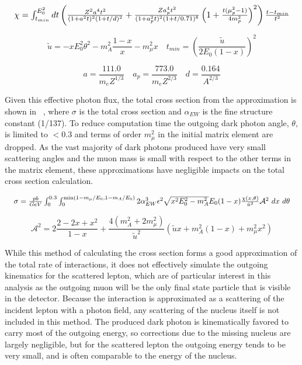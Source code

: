 \begin{equation}
    \label{eq:chi}
    \resizebox{\textwidth}{!}{
    $\chi = \int^{E_0^2}_{t_{min}} dt \left( \frac{Z^2a^4t^2}{(1+a^2t)^2(1+t/d)^2}+\frac{Za_p^4t^2}{(1+a_p^2t)^2(1+t/0.71)^8}\left(1+\frac{t(\mu_p^2-1)}{4m_p^2}\right)^2\right)\frac{t-t_{min}}{t^2}$
    }
\end{equation}	


\begin{equation}
	\label{eq:utilde}
	\tilde{u} = -xE_0^2\theta^2 - m_A^2\frac{1-x}{x} - m_\mu^2x
	\quad
	t_{min} = \left(\frac{\tilde{u}}{2E_0(1-x)}\right)^2
\end{equation}

\begin{equation}
	\label{eq:adefs}
	a = \frac{111.0}{m_e Z^{1/3}}
	\quad
	a_p = \frac{773.0}{m_e Z^{2/3}}
	\quad
	d = \frac{0.164}{A^{2/3}}
\end{equation}

Given this effective photon flux, the total cross section from the \ww approximation is shown in ~\cite{Bjorken_2009}, where $\sigma$ is the total cross section and $\alpha_{EW}$ is the fine structure constant (1/137).
To reduce computation time the outgoing dark photon angle, $\theta$, is limited to $<$0.3 and terms of order $m_\mu^2$ in the initial matrix element are dropped.
As the vast majority of dark photons produced have very small scattering angles and the muon mass is small with respect to the other terms in the matrix element, these approximations have negligible impacts on the total cross section calculation.


\begin{equation}
    \resizebox{\textwidth}{!}{
    $
	    \sigma = \frac{pb}{GeV} \int_0^{0.3} \int_0^{\min(1-m_\mu/E_0,1-m_A/E_0)} 2 \alpha_{EW}^3\epsilon^2 \sqrt{x^2E_0^2 - m_A^2}E_0(1-x) 
		\frac{\chi(x,\theta)}{\tilde{u}^2} \mathcal{A}^2
~dx~d\theta
    $
    }
    \label{eq:fullCX}
\end{equation}

\begin{equation}
	\label{eq:afunc}
	\mathcal{A}^2 = 2\frac{2-2x+x^2}{1-x}+\frac{4(m_A^2+2m_\mu^2)}{\tilde{u}^2}(\tilde{u}x + m_A^2(1-x) + m_\mu^2x^2)
\end{equation}

While this method of calculating the cross section forms a good approximation of the total rate of \dbrem interactions, it does not effectively simulate the outgoing kinematics for the scattered lepton, which are of particular interest in this analysis as the outgoing muon will be the only final state particle that is visible in the detector.
Because the interaction is approximated as a scattering of the incident lepton with a photon field, any scattering of the nucleus itself is not included in this method.
The produced dark photon is kinematically favored to carry most of the outgoing energy, so corrections due to the missing nucleus are largely negligible, but for the scattered lepton the outgoing energy tends to be very small, and is often comparable to the energy of the nucleus.

